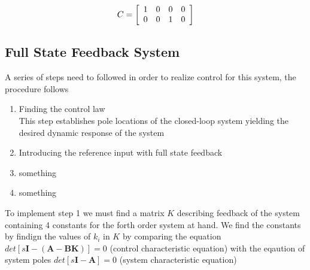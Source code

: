 \documentclass[a4paper, 12pt]{article}
\begin{document}
\begin{equation}
  C = \left[
  \begin{array}{c c c c}
    1 & 0 & 0 & 0\\
    0 & 0 & 1 & 0\\
  \end{array}
  \right]
  \label{eq:c_q1}
\end{equation}



\subsection{Full State Feedback System} %
\label{sub:full_state_feedback_system}
A series of steps need to followed in order to realize control for this system, the procedure follows
\begin{enumerate}
	\item Finding the control law\\
	This step establishes pole locations of the closed-loop system yielding the desired dynamic response of the system
	\item Introducing the reference input with full state feedback
	\item something 
	\item something 
\end{enumerate}

To implement step 1 we must find a matrix $K$ describing feedback of the system containing 4 constants for the forth order system at hand. We find the constants by findign the values of $k_i$ in $K$ by comparing the equation $det[s\textbf{I}-(\textbf{A}-\textbf{BK})] = 0$ (control characteristic equation) with the eqaution of system poles $det[s\textbf{I}-\textbf{A}] = 0$ (system characteristic equation)



\end{document}
